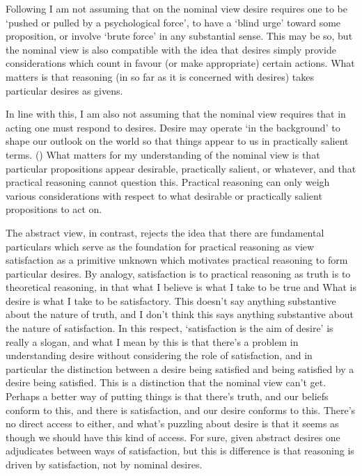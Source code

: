 \documentclass[10pt]{article}
\begin{document}
Following \textcite[133]{Schapiro:2014aa} I am not assuming that on the nominal view desire requires one to be `pushed or pulled by a psychological force', to have a `blind urge' toward some proposition, or involve `brute force' in any substantial sense.
This may be so, but the nominal view is also compatible with the idea that desires simply provide considerations which count in favour (or make appropriate) certain actions.
What matters is that reasoning (in so far as it is concerned with desires) takes particular desires as givens.

In line with this, I am also not assuming that the nominal view requires that in acting one must respond to desires.
Desire may operate `in the background' to shape our outlook on the world so that things appear to us in practically salient terms.
(\cite[133]{Pettit:1990aa,Schapiro:2014aa})
What matters for my understanding of the nominal view is that particular propositions appear desirable, practically salient, or whatever, and that practical reasoning cannot question this.
Practical reasoning can only weigh various considerations with respect to what desirable or practically salient propositions to act on.

The abstract view, in contrast, rejects the idea that there are fundamental particulars which serve as the foundation for practical reasoning as view satisfaction as a primitive unknown which motivates practical reasoning to form particular desires.
By analogy, satisfaction is to practical reasoning as truth is to theoretical reasoning, in that what I believe is what I take to be true and What is desire is what I take to be satisfactory.
This doesn't say anything substantive about the nature of truth, and I don't think this says anything substantive about the nature of satisfaction.
In this respect, `satisfaction is the aim of desire' is really a slogan, and what I mean by this is that there's a problem in understanding desire without considering the role of satisfaction, and in particular the distinction between a desire being satisfied and being satisfied by a desire being satisfied.
This is a distinction that the nominal view can't get.
Perhaps a better way of putting things is that there's truth, and our beliefs conform to this, and there is satisfaction, and our desire conforms to this.
There's no direct access to either, and what's puzzling about desire is that it seems as though we should have this kind of access.
For sure, given abstract desires one adjudicates between ways of satisfaction, but this is difference is that reasoning is driven by satisfaction, not by nominal desires.
\end{document}
